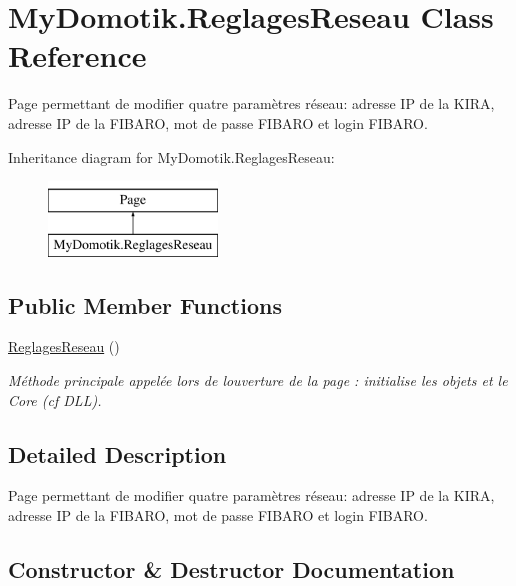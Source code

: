 \hypertarget{class_my_domotik_1_1_reglages_reseau}{}\section{My\+Domotik.\+Reglages\+Reseau Class Reference}
\label{class_my_domotik_1_1_reglages_reseau}


Page permettant de modifier quatre paramètres réseau\+: adresse IP de la K\+I\+RA, adresse IP de la F\+I\+B\+A\+RO, mot de passe F\+I\+B\+A\+RO et login F\+I\+B\+A\+RO.  


Inheritance diagram for My\+Domotik.\+Reglages\+Reseau\+:\begin{figure}[H]
\begin{center}
\leavevmode
\includegraphics[height=2.000000cm]{class_my_domotik_1_1_reglages_reseau}
\end{center}
\end{figure}
\subsection*{Public Member Functions}
\begin{DoxyCompactItemize}
\item 
\hyperlink{class_my_domotik_1_1_reglages_reseau_a557f04970aa7d6f793aec57d12bd525a}{Reglages\+Reseau} ()
\begin{DoxyCompactList}\small\item\em Méthode principale appelée lors de l\textquotesingle{}ouverture de la page \+: initialise les objets et le Core (cf D\+LL). \end{DoxyCompactList}\end{DoxyCompactItemize}


\subsection{Detailed Description}
Page permettant de modifier quatre paramètres réseau\+: adresse IP de la K\+I\+RA, adresse IP de la F\+I\+B\+A\+RO, mot de passe F\+I\+B\+A\+RO et login F\+I\+B\+A\+RO. 



\subsection{Constructor \& Destructor Documentation}
